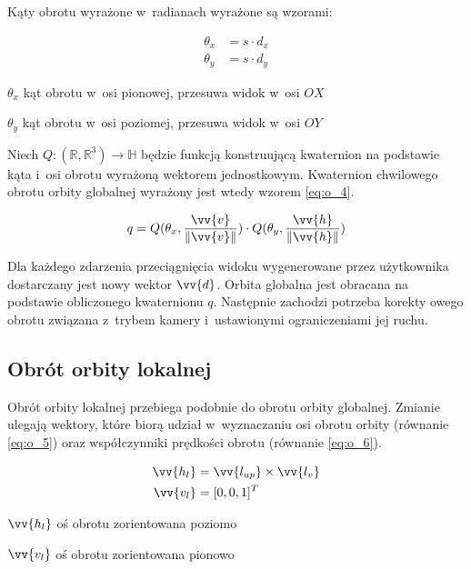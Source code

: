 Kąty obrotu wyrażone w~radianach wyrażone są wzorami:
\begin{samepage}
    \begin{align}
        \label{eq:o_3}
        \theta_x &= s \cdot d_x \\
        \theta_y &= s \cdot d_y
    \end{align}
    \begin{eqexpl}[25mm]
        \item {$\theta_x$} kąt obrotu w~osi pionowej, przesuwa widok w~osi $OX$
        \item {$\theta_y$} kąt obrotu w~osi poziomej, przesuwa widok w~osi $OY$
    \end{eqexpl}
    \vspace{\baselineskip}
\end{samepage}

Niech $Q: (\mathbb{R}, \mathbb{R}^3) \to \mathbb{H}$ będzie funkcją konstruującą kwaternion na podstawie kąta i~osi obrotu wyrażoną wektorem jednostkowym. Kwaternion chwilowego obrotu orbity globalnej wyrażony jest wtedy wzorem \ref{eq:o_4}.

\begin{samepage}
    \begin{equation}
        \label{eq:o_4}
        q = Q(\theta_x, \frac{\vv{v}}{\Vert\vv{v}\Vert}) \cdot Q(\theta_y, \frac{\vv{h}}{\Vert\vv{h}\Vert})
    \end{equation}
    \vspace{\baselineskip}
\end{samepage}

Dla każdego zdarzenia przeciągnięcia widoku wygenerowane przez użytkownika dostarczany jest nowy wektor $\vv{d}$. Orbita globalna jest obracana na podstawie obliczonego kwaternionu $q$. Następnie zachodzi potrzeba korekty owego obrotu związana z~trybem kamery i~ustawionymi ograniczeniami jej ruchu. 

\subsection{Obrót orbity lokalnej}
Obrót orbity lokalnej przebiega podobnie do obrotu orbity globalnej. Zmianie ulegają wektory, które biorą udział w~wyznaczaniu osi obrotu orbity (równanie \ref{eq:o_5}) oraz współczynniki prędkości obrotu (równanie \ref{eq:o_6}).

\begin{samepage}
    \begin{align}
        \label{eq:o_5}
        \vv{h_l} &= \vv{l_{up}} \times \vv{l_{v}}\\
        \vv{v_l} &= [0, 0, 1]^T
    \end{align}
    \begin{eqexpl}[25mm]
        \item {$\vv{h_l}$} oś obrotu zorientowana poziomo
        \item {$\vv{v_l}$} oś obrotu zorientowana pionowo
    \end{eqexpl}
    \vspace{\baselineskip}
\end{samepage}

